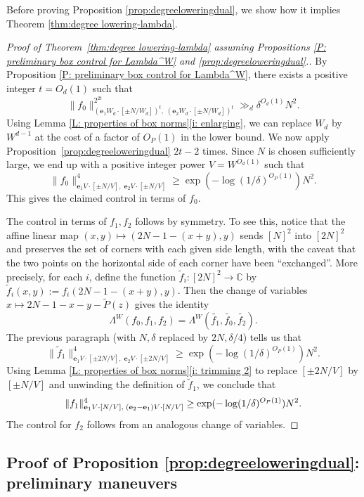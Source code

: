 \documentclass[11pt]{amsart}
\theoremstyle{definition}
\newcommand{\C}{{\mathbb C}}
\newcommand{\be}{{\mathbf{e}}}
\begin{document}
Before proving Proposition \ref{prop:degreeloweringdual}, we show how it implies Theorem \ref{thm:degree lowering-lambda}.

\begin{proof}[Proof of Theorem~\ref{thm:degree lowering-lambda} assuming Propositions \ref{P: preliminary box control for Lambda^W} and \ref{prop:degreeloweringdual}.]
By Proposition \ref{P: preliminary box control for Lambda^W}, there exists a positive integer $t=O_d(1)$ such that 
$$\|f_0\|_{(\be_1W_d \cdot [\pm N/W_d])^t,\; (\be_2 W_d \cdot [\pm N/W_d])^t}^{2^{2t}} \gg_{d}\delta^{O_d(1)} N^2.$$
Using Lemma \ref{L: properties of box norms}\eqref{i: enlarging}, we can replace $W_d$ by $W^{d-1}$ at the cost of a factor of $O_P(1)$ in the lower bound.
We now apply Proposition~\ref{prop:degreeloweringdual} $2t-2$ times.  Since $N$ is chosen sufficiently large, we end up with a positive integer power $V = W^{O_d(1)}$ such that
$$\|f_0\|_{\be_1V \cdot [\pm N/V],\; \be_2 V \cdot [\pm N/V]}^{4} \geq \exp(-\log(1/\delta)^{O_P(1)}) N^2.$$
This gives the claimed control in terms of $f_0$.

The control in terms of $f_1,f_2$ follows by symmetry. To see this, notice that the affine linear map $(x, y) \mapsto (2N-1-(x + y), y)$ sends $[N]^2$ into $[2N]^2$ and preserves the set of corners with each given side length, with the caveat that the two points on the horizontal side of each corner have been ``exchanged''.  More precisely, for each $i$, define the function $\widetilde f_i: [2N]^2 \to \C$ by $\widetilde f_i(x,y):=f_i(2N-1-(x + y), y)$.  Then the change of variables $x \mapsto 2N-1-x-y-\widetilde P(z)$ gives the identity
$$\Lambda^W(f_0, f_1, f_2) = \Lambda^W(\widetilde{f_1}, \widetilde{f_0}, \widetilde{f_2}).$$
The previous paragraph (with $N,\delta$ replaced by $2N, \delta/4$) tells us that
$$\|\widetilde f_1\|_{\be_1V \cdot [\pm 2N/V],\; \be_2 V \cdot [\pm2 N/V]}^{4} \geq \exp(-\log(1/\delta)^{O_P(1)}) N^2.$$
Using Lemma \ref{L: properties of box norms}\eqref{i: trimming 2} to replace $[\pm2 N/V]$ by $[\pm N/V]$ and unwinding the definition of $\widetilde f_1$, we conclude that $$\|f_1\|_{\be_1V \cdot [N/V],\; (\be_2-\be_1)V \cdot [N/V]}^4 \geq \exp(-\log(1/\delta)^{O_P(1)}) N^2.\\$$
The control for $f_2$ follows from an analogous change of variables.
\end{proof}

\subsection{Proof of Proposition \ref{prop:degreeloweringdual}: preliminary maneuvers}
\end{document}
